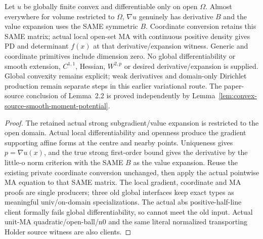 \begin{lemma}
  \label{lem:convex-gradient-derivative}
  \leanok
  Let $u$ be globally finite convex and differentiable only on open $\Omega$.
  Almost everywhere for volume restricted to $\Omega$, $\nabla u$ genuinely has
  derivative $B$ and the value expansion uses the SAME symmetric $B$. Coordinate
  conversion retains this SAME matrix; actual local open-set MA with continuous
  positive density gives PD and determinant $f(x)$ at that derivative/expansion
  witness. Generic and coordinate primitives include dimension zero. No global
  differentiability or smooth extension, $C^{1,1}$, Hessian, $W^{2,p}$ or desired
  derivative/expansion is supplied. Global convexity remains explicit; weak
  derivatives and domain-only Dirichlet production remain separate steps in this earlier
  variational route. The paper-source conclusion of Lemma~2.2 is proved independently by
  Lemma~\ref{lem:convex-source-smooth-moment-potential}.
\end{lemma}
\begin{proof}
  \leanok
  The retained actual strong subgradient/value expansion is restricted to the
  open domain. Actual local differentiability and openness produce the gradient
  supporting affine forms at the centre and nearby points. Uniqueness gives
  $p=\nabla u(x)$, and the true strong first-order bound gives the derivative
  by the little-o norm criterion with the SAME $B$ as the value expansion.
  Reuse the existing private coordinate conversion unchanged, then apply the
  actual pointwise MA equation to that SAME matrix. The local gradient,
  coordinate and MA proofs are single producers; three old global interfaces
  keep exact types as meaningful univ/on-domain specializations. The actual abs
  positive-half-line client formally fails global differentiability, so cannot
  meet the old input. Actual unit-MA quadratic/open-ball/n0 and the same literal
  normalized transporting Holder source witness are also clients.
\end{proof}


